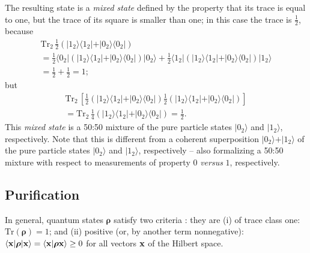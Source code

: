 {The resulting state is a
{\em mixed state}
defined by the property that its trace is equal to one,
but the trace of its square is smaller than one; in this case the trace is $\frac{1}{2}$, because
\begin{equation}
\begin{split}
\textrm{Tr}_2\,
\frac{1}{2}
\left(
\vert 1_2 \rangle \langle   1_2 \vert
+
\vert 0_2 \rangle \langle   0_2 \vert
\right) \\
= \frac{1}{2}  \langle 0_2 \vert
\left(
\vert 1_2 \rangle \langle   1_2 \vert
+
\vert 0_2 \rangle \langle   0_2 \vert
\right)
\vert 0_2 \rangle
+  \frac{1}{2}
\langle 1_2  \vert
\left(
\vert 1_2 \rangle \langle   1_2 \vert
+
\vert 0_2 \rangle \langle   0_2 \vert
\right)
\vert 1_2 \rangle  \\
=  \frac{1}{2} + \frac{1}{2} =1;
\end{split}
\end{equation}
but
\begin{equation}
\begin{split}
\textrm{Tr}_2\,
\left[
\frac{1}{2}
\left(
\vert 1_2 \rangle \langle   1_2 \vert
+
\vert 0_2 \rangle \langle   0_2 \vert
\right)
\frac{1}{2}
\left(
\vert 1_2 \rangle \langle   1_2 \vert
+
\vert 0_2 \rangle \langle   0_2 \vert
\right)
\right]
\\ =
\textrm{Tr}_2\,
\frac{1}{4}
\left(
\vert 1_2 \rangle \langle   1_2 \vert
+
\vert 0_2 \rangle \langle   0_2 \vert
\right)
= \frac{1}{2}.
\end{split}
\end{equation}
This {\em mixed state} is a 50:50 mixture of the pure particle states  $\vert 0_2 \rangle$ and $\vert 1_2 \rangle$, respectively.
Note that this is different from
a coherent superposition
$\vert 0_2 \rangle + \vert 1_2 \rangle$
 of the pure particle states  $\vert 0_2 \rangle$ and $\vert 1_2 \rangle$, respectively --
also formalizing a 50:50 mixture with respect to measurements of property $0$ {\it versus} $1$, respectively.

}


\subsection{Purification}
\label{2015-m-ch-fdvs-purification}


In general, quantum states ${\boldsymbol{\rho}}$ satisfy two criteria \cite{ba-89}:  they are
(i) of trace class one:
$\textrm{Tr}({\boldsymbol{\rho}}) =1$;
and
(ii) positive (or, by another term nonnegative):
$
\langle {\bf x} \vert {\boldsymbol{\rho}} \vert {\bf x} \rangle
=\langle {\bf x} \vert {\boldsymbol{\rho}}  {\bf x} \rangle \ge  0
$ for all vectors ${\bf x}$ of the  Hilbert space.

